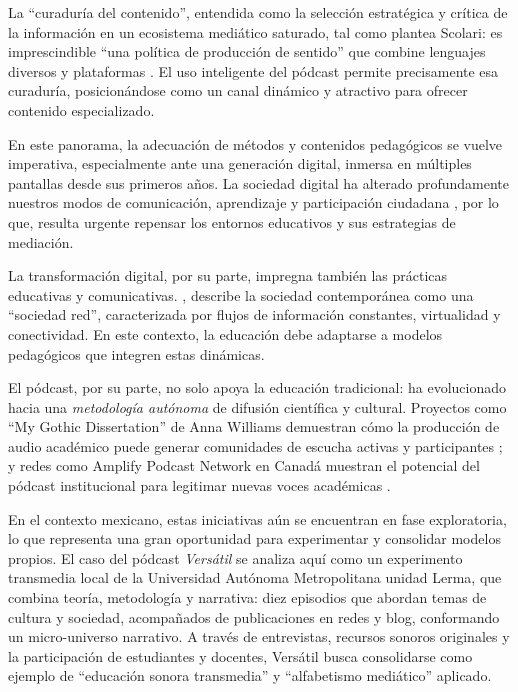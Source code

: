 \documentclass[
  spanish,
  11pt,
  a4paper,
]{scrbook}
\begin{document}
La ``curaduría del contenido'', entendida como la selección estratégica
y crítica de la información en un ecosistema mediático saturado, tal
como plantea Scolari: es imprescindible ``una política de producción de
sentido'' que combine lenguajes diversos y plataformas
\autocite{MontoyaRojas2019}. El uso inteligente del pódcast permite
precisamente esa curaduría, posicionándose como un canal dinámico y
atractivo para ofrecer contenido especializado.

En este panorama, la adecuación de métodos y contenidos pedagógicos se
vuelve imperativa, especialmente ante una generación digital, inmersa en
múltiples pantallas desde sus primeros años. La sociedad digital ha
alterado profundamente nuestros modos de comunicación, aprendizaje y
participación ciudadana \autocite{Castells2006}, por lo que, resulta
urgente repensar los entornos educativos y sus estrategias de mediación.

La transformación digital, por su parte, impregna también las prácticas
educativas y comunicativas. \textcite{Castells2006}, describe la
sociedad contemporánea como una ``sociedad red'', caracterizada por
flujos de información constantes, virtualidad y conectividad. En este
contexto, la educación debe adaptarse a modelos pedagógicos que integren
estas dinámicas.

El pódcast, por su parte, no solo apoya la educación tradicional: ha
evolucionado hacia una \emph{metodología autónoma} de difusión
científica y cultural. Proyectos como ``My Gothic Dissertation'' de Anna
Williams demuestran cómo la producción de audio académico puede generar
comunidades de escucha activas y participantes \autocite{Williams2019};
y redes como Amplify Podcast Network en Canadá muestran el potencial del
pódcast institucional para legitimar nuevas voces académicas
\autocite{BeltranNieves2024}.

En el contexto mexicano, estas iniciativas aún se encuentran en fase
exploratoria, lo que representa una gran oportunidad para experimentar y
consolidar modelos propios. El caso del pódcast \emph{Versátil} se
analiza aquí como un experimento transmedia local de la Universidad
Autónoma Metropolitana unidad Lerma, que combina teoría, metodología y
narrativa: diez episodios que abordan temas de cultura y sociedad,
acompañados de publicaciones en redes y blog, conformando un
micro-universo narrativo. A través de entrevistas, recursos sonoros
originales y la participación de estudiantes y docentes, Versátil busca
consolidarse como ejemplo de ``educación sonora transmedia'' y
``alfabetismo mediático'' aplicado.
\end{document}
